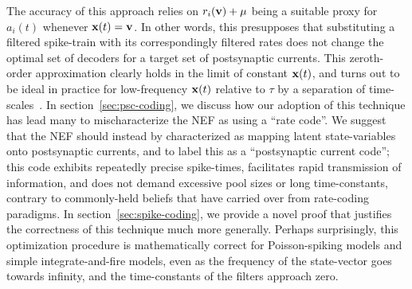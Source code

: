 
The accuracy of this approach relies on $r_i(\mathbf{v}) + \mu$ being a suitable proxy for $a_i(t)$ whenever $\mathbf{x}(t) = \mathbf{v}$.
In other words, this presupposes that substituting a filtered spike-train with its correspondingly filtered rates does not change the optimal set of decoders for a target set of postsynaptic currents.
This zeroth-order approximation clearly holds in the limit of constant $\mathbf{x}(t)$, and turns out to be ideal in practice for low-frequency $\mathbf{x}(t)$ relative to $\tau$ by a separation of time-scales~\citep[][appendix~F.1]{eliasmith2003a}.
In section~\ref{sec:psc-coding}, we discuss how our adoption of this technique has lead many to mischaracterize the NEF as using a ``rate code''.
We suggest that the NEF should instead by characterized as mapping latent state-variables onto postsynaptic currents, and to label this as a ``postsynaptic current code''; this code exhibits repeatedly precise spike-times, facilitates rapid transmission of information, and does not demand excessive pool sizes or long time-constants, contrary to commonly-held beliefs that have carried over from rate-coding paradigms.
In section~\ref{sec:spike-coding}, we provide a novel proof that justifies the correctness of this technique much more generally.
Perhaps surprisingly, this optimization procedure is mathematically correct for Poisson-spiking models and simple integrate-and-fire models, even as the frequency of the state-vector goes towards infinity, and the time-constants of the filters approach zero.

